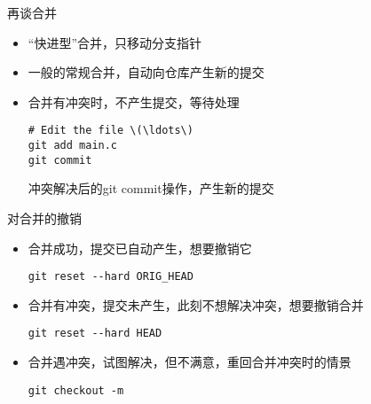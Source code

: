\begin{frame}[<+->][fragile]{再谈合并}
    \begin{itemize}
        \item “快进型”合并，只移动分支指针
        \item 一般的常规合并，自动向仓库产生新的提交
        \item 合并有冲突时，不产生提交，等待处理
        \begin{Verbatim}[frame=single,commandchars=\\\{\}]
# Edit the file \(\ldots\)
git add main.c
git commit
        \end{Verbatim}
        冲突解决后的git commit操作，产生新的提交
    \end{itemize}
\end{frame}

\begin{frame}[<+->][fragile]{对合并的撤销}
    \begin{itemize}
        \item 合并成功，提交已自动产生，想要撤销它
        \begin{Verbatim}[frame=single,commandchars=\\\{\}]
git reset --hard ORIG_HEAD
        \end{Verbatim}
        \item 合并有冲突，提交未产生，此刻不想解决冲突，想要撤销合并
        \begin{Verbatim}[frame=single,commandchars=\\\{\}]
git reset --hard HEAD
        \end{Verbatim}
        \item 合并遇冲突，试图解决，但不满意，重回合并冲突时的情景
        \begin{Verbatim}[frame=single,commandchars=\\\{\}]
git checkout -m
        \end{Verbatim}
    \end{itemize}
\end{frame}
